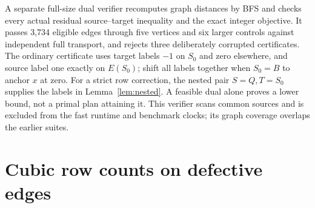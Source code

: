 \documentclass[11pt]{article}
\theoremstyle{remark}
\begin{document}
A separate full-size dual verifier recomputes graph distances by BFS and checks every actual residual source--target inequality and the exact integer objective. It passes 3,734 eligible edges through five vertices and six larger controls against independent full transport, and rejects three deliberately corrupted certificates. The ordinary certificate uses target labels $-1$ on $S_0$ and zero elsewhere, and source label one exactly on $E(S_0)$; shift all labels together when $S_0=B$ to anchor $x$ at zero. For a strict row correction, the nested pair $S=Q,T=S_0$ supplies the labels in Lemma~\ref{lem:nested}. A feasible dual alone proves a lower bound, not a primal plan attaining it. This verifier scans common sources and is excluded from the fast runtime and benchmark clocks; its graph coverage overlaps the earlier suites.

\section{Cubic row counts on defective edges}\label{sec:sharp}
\end{document}
